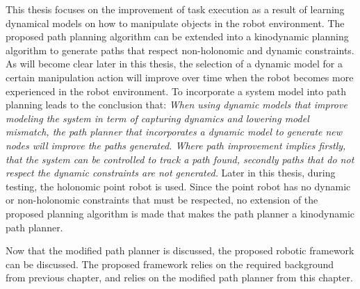 This thesis focuses on the improvement of task execution as a result of learning dynamical models on how to manipulate objects in the robot environment. The proposed path planning algorithm can be extended into a kinodynamic planning algorithm to generate paths that respect non-holonomic and dynamic constraints. As will become clear later in this thesis, the selection of a dynamic model for a certain manipulation action will improve over time when the robot becomes more experienced in the robot environment. To incorporate a system model into path planning leads to the conclusion that: \textit{When using dynamic models that improve modeling the system in term of capturing dynamics and lowering model mismatch, the path planner that incorporates a dynamic model to generate new nodes will improve the paths generated. Where path improvement implies firstly, that the system can be controlled to track a path found, secondly paths that do not respect the dynamic constraints are not generated.} Later in this thesis, during testing, the holonomic point robot is used. Since the point robot has no dynamic or non-holonomic constraints that must be respected, no extension of the proposed planning algorithm is made that makes the path planner a kinodynamic path planner.\bs

Now that the modified path planner is discussed, the proposed robotic framework can be discussed. The proposed framework relies on the required background from previous chapter, and relies on the modified path planner from this chapter.\bs




